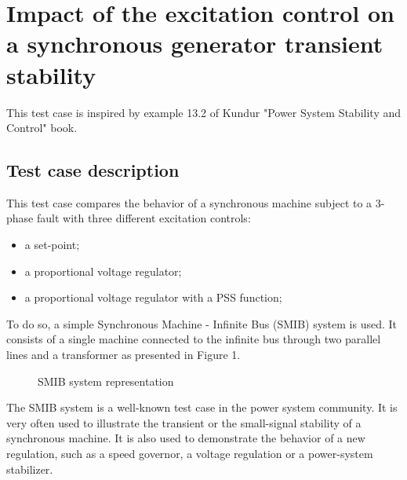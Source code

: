 \documentclass[a4paper, 12pt]{report}
\begin{document}
\chapter{Impact of the excitation control on a synchronous generator transient stability}

This test case is inspired by example 13.2 of Kundur "Power System Stability and Control" book.

\section{Test case description}

This test case compares the behavior of a synchronous machine subject to a 3-phase fault with three different excitation controls:
\begin{itemize}
\item a set-point;
\item a proportional voltage regulator;
\item a proportional voltage regulator with a PSS function;
\end{itemize}
To do so, a simple Synchronous Machine - Infinite Bus (SMIB) system is used. It consists of a single machine connected to the infinite bus through two parallel lines and a transformer as presented in Figure 1.

\begin{figure}[H]
\centering
\def\factor{0.4}
\caption{SMIB system representation}
\label{circuit-1}
\end{figure}

The SMIB system is a well-known test case in the power system community. It is very often used to illustrate the transient or the small-signal stability of a synchronous machine. It is also used to demonstrate the behavior of a new regulation, such as a speed governor, a voltage regulation or a power-system stabilizer.
\end{document}
